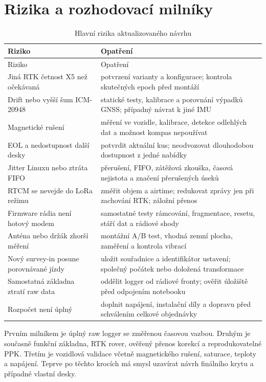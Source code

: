 \section{Rizika a rozhodovací milníky}

\small
\begin{longtable}{@{}L{0.32\textwidth}L{0.60\textwidth}@{}}
  \caption{Hlavní rizika aktualizovaného návrhu}\label{tab:risks}\\
  \toprule
  Riziko & Opatření \\
  \midrule
  \endfirsthead
  \toprule
  Riziko & Opatření \\
  \midrule
  \endhead
  Jiná RTK četnost X5 než očekávaná & potvrzení varianty a konfigurace; kontrola skutečných epoch před montáží \\
  Drift nebo vyšší šum ICM-20948 & statické testy, kalibrace a porovnání výpadků GNSS; případný návrat k jiné IMU \\
  Magnetické rušení & měření ve vozidle, kalibrace, detekce odlehlých dat a možnost kompas nepoužívat \\
  EOL a nedostupnost další desky & potvrdit aktuální kus; neodvozovat dlouhodobou dostupnost z jedné nabídky \\
  Jitter Linuxu nebo ztráta FIFO & přerušení, FIFO, zátěžová zkouška, časová nejistota a značení přerušených úseků \\
  RTCM se nevejde do LoRa režimu & změřit objem a airtime; redukovat zprávy jen při zachování RTK; záložní přenos \\
  Firmware rádia není hotový modem & samostatné testy rámcování, fragmentace, resetu, stáří dat a rádiové shody \\
  Anténa nebo držák zhorší měření & montážní A/B test, vhodná zemní plocha, zaměření a kontrola vibrací \\
  Nový survey-in posune porovnávané jízdy & uložit souřadnice a identifikátor ustavení; společný počátek nebo doložená transformace \\
  Samostatná základna ztratí raw data & oddělit logger od rádiové fronty; ověřit úložiště před odpojením notebooku \\
  Rozpočet není úplný & doplnit napájení, instalační díly a dopravu před schválením celkové objednávky \\
  \bottomrule
\end{longtable}
\normalsize

Prvním milníkem je úplný raw logger se změřenou časovou vazbou. Druhým je
současně funkční základna, RTK rover, ověřený přenos korekcí a reprodukovatelné
PPK. Třetím je vozidlová validace včetně magnetického rušení, saturace,
teploty a napájení. Teprve po těchto krocích má smysl uzavírat návrh finálního
krytu a případné vlastní desky.

